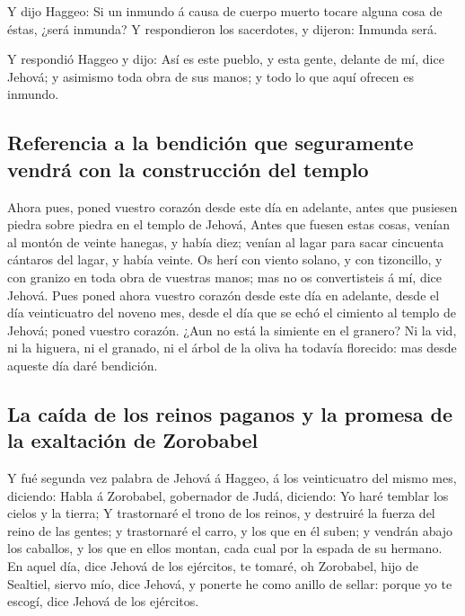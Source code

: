  Y dijo Haggeo: Si un inmundo á causa de cuerpo muerto
tocare alguna cosa de éstas, ¿será inmunda? Y respondieron los
sacerdotes, y dijeron: Inmunda será.

 Y respondió Haggeo y dijo: Así es este pueblo, y esta
gente, delante de mí, dice Jehová; y asimismo toda obra de sus manos; y
todo lo que aquí ofrecen es inmundo.

\hypertarget{referencia-a-la-bendiciuxf3n-que-seguramente-vendruxe1-con-la-construcciuxf3n-del-templo}{%
\subsection{Referencia a la bendición que seguramente vendrá con la
construcción del
templo}\label{referencia-a-la-bendiciuxf3n-que-seguramente-vendruxe1-con-la-construcciuxf3n-del-templo}}

 Ahora pues, poned vuestro corazón desde este día en
adelante, antes que pusiesen piedra sobre piedra en el templo de Jehová,
 Antes que fuesen estas cosas, venían al montón de veinte
hanegas, y había diez; venían al lagar para sacar cincuenta cántaros del
lagar, y había veinte.  Os herí con viento solano, y con
tizoncillo, y con granizo en toda obra de vuestras manos; mas no os
convertisteis á mí, dice Jehová.  Pues poned ahora vuestro
corazón desde este día en adelante, desde el día veinticuatro del noveno
mes, desde el día que se echó el cimiento al templo de Jehová; poned
vuestro corazón.  ¿Aun no está la simiente en el granero?
Ni la vid, ni la higuera, ni el granado, ni el árbol de la oliva ha
todavía florecido: mas desde aqueste día daré bendición.

\hypertarget{la-cauxedda-de-los-reinos-paganos-y-la-promesa-de-la-exaltaciuxf3n-de-zorobabel}{%
\subsection{La caída de los reinos paganos y la promesa de la exaltación
de
Zorobabel}\label{la-cauxedda-de-los-reinos-paganos-y-la-promesa-de-la-exaltaciuxf3n-de-zorobabel}}

 Y fué segunda vez palabra de Jehová á Haggeo, á los
veinticuatro del mismo mes, diciendo:  Habla á Zorobabel,
gobernador de Judá, diciendo: Yo haré temblar los cielos y la tierra;
 Y trastornaré el trono de los reinos, y destruiré la
fuerza del reino de las gentes; y trastornaré el carro, y los que en él
suben; y vendrán abajo los caballos, y los que en ellos montan, cada
cual por la espada de su hermano.  En aquel día, dice
Jehová de los ejércitos, te tomaré, oh Zorobabel, hijo de Sealtiel,
siervo mío, dice Jehová, y ponerte he como anillo de sellar: porque yo
te escogí, dice Jehová de los ejércitos.

